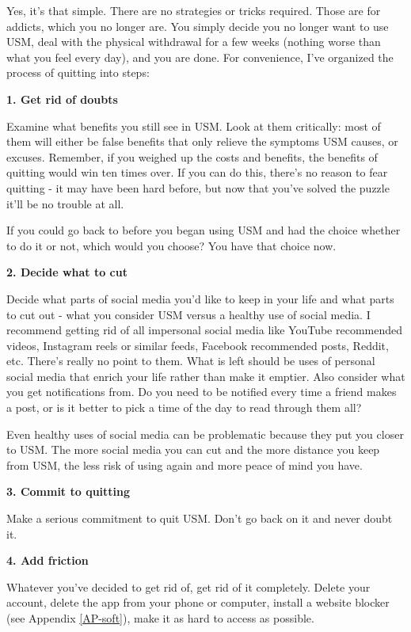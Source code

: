 \documentclass[
  openany]{book}
\newenvironment{rmdnote}{
\color{blue}
\begin{framed}}{\end{framed}}
\begin{document}
Yes, it's that simple. There are no strategies or tricks required. Those are for addicts, which you no longer are. You simply decide you no longer want to use USM, deal with the physical withdrawal for a few weeks (nothing worse than what you feel every day), and you are done. For convenience, I've organized the process of quitting into steps:

\textbf{1. Get rid of doubts}

Examine what benefits you still see in USM. Look at them critically: most of them will either be false benefits that only relieve the symptoms USM causes, or excuses. Remember, if you weighed up the costs and benefits, the benefits of quitting would win ten times over. If you can do this, there's no reason to fear quitting - it may have been hard before, but now that you've solved the puzzle it'll be no trouble at all.

\begin{rmdnote}
If you could go back to before you began using USM and had the choice whether to do it or not, which would you choose? You have that choice now.

\end{rmdnote}

\textbf{2. Decide what to cut}

Decide what parts of social media you'd like to keep in your life and what parts to cut out - what you consider USM versus a healthy use of social media. I recommend getting rid of all impersonal social media like YouTube recommended videos, Instagram reels or similar feeds, Facebook recommended posts, Reddit, etc. There's really no point to them. What is left should be uses of personal social media that enrich your life rather than make it emptier. Also consider what you get notifications from. Do you need to be notified every time a friend makes a post, or is it better to pick a time of the day to read through them all?

Even healthy uses of social media can be problematic because they put you closer to USM. The more social media you can cut and the more distance you keep from USM, the less risk of using again and more peace of mind you have.

\textbf{3. Commit to quitting}

Make a serious commitment to quit USM. Don't go back on it and never doubt it.

\textbf{4. Add friction}

Whatever you've decided to get rid of, get rid of it completely. Delete your account, delete the app from your phone or computer, install a website blocker (see Appendix \ref{AP-soft}), make it as hard to access as possible.
\end{document}

